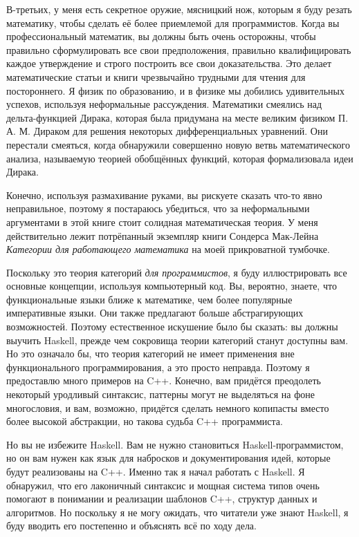 В-третьих, у меня есть секретное оружие, мясницкий нож, которым я буду резать 
математику, чтобы сделать её более приемлемой для программистов. Когда вы 
профессиональный математик, вы должны быть очень осторожны, чтобы правильно 
сформулировать все свои предположения, правильно квалифицировать каждое 
утверждение и строго построить все свои доказательства. Это делает математические 
статьи и книги чрезвычайно трудными для чтения для постороннего. Я физик по 
образованию, и в физике мы добились удивительных успехов, используя неформальные 
рассуждения. Математики смеялись над дельта-функцией Дирака, которая была 
придумана на месте великим физиком П. А. М. Дираком для решения некоторых 
дифференциальных уравнений. Они перестали смеяться, когда обнаружили совершенно 
новую ветвь математического анализа, называемую теорией обобщённых функций, 
которая формализовала идеи Дирака.

Конечно, используя размахивание руками, вы рискуете сказать что-то явно 
неправильное, поэтому я постараюсь убедиться, что за неформальными аргументами 
в этой книге стоит солидная математическая теория. У меня действительно лежит 
потрёпанный экземпляр книги Сондерса Мак-Лейна \emph{Категории для 
  работающего математика} на моей прикроватной тумбочке.

Поскольку это теория категорий \emph{для программистов}, я буду иллюстрировать 
все основные концепции, используя компьютерный код. Вы, вероятно, знаете, что 
функциональные языки ближе к математике, чем более популярные императивные языки. 
Они также предлагают больше абстрагирующих возможностей. Поэтому естественное 
искушение было бы сказать: вы должны выучить Haskell, прежде чем сокровища теории 
категорий станут доступны вам. Но это означало бы, что теория категорий не имеет 
применения вне функционального программирования, а это просто неправда. Поэтому 
я предоставлю много примеров на C++. Конечно, вам придётся преодолеть некоторый 
уродливый синтаксис, паттерны могут не выделяться на фоне многословия, и вам, 
возможно, придётся сделать немного копипасты вместо более высокой абстракции, 
но такова судьба C++ программиста.

Но вы не избежите Haskell. Вам не нужно становиться Haskell-программистом, 
но он вам нужен как язык для набросков и документирования идей, которые будут 
реализованы на C++. Именно так я начал работать с Haskell. Я обнаружил, что его 
лаконичный синтаксис и мощная система типов очень помогают в понимании и 
реализации шаблонов C++, структур данных и алгоритмов. Но поскольку я не могу 
ожидать, что читатели уже знают Haskell, я буду вводить его постепенно и 
объяснять всё по ходу дела.

